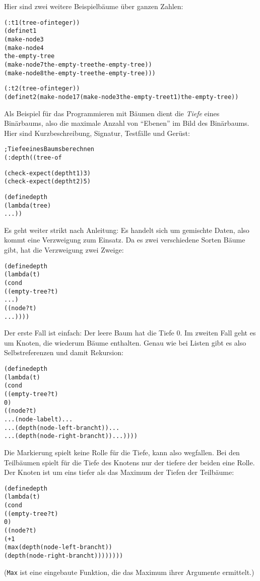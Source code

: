 %
Hier sind zwei weitere Beispielbäume über ganzen Zahlen:
\begin{alltt}
(: t1 (tree-of integer))
(define t1
  (make-node 3
    (make-node 4
      the-empty-tree
      (make-node 7 the-empty-tree the-empty-tree))
    (make-node 8 the-empty-tree the-empty-tree)))

(: t2 (tree-of integer))
(define t2 (make-node 17 (make-node 3 the-empty-tree t1) the-empty-tree))
\end{alltt}
Als Beispiel für das Programmieren mit Bäumen dient die
\textit{Tiefe}
eines Binärbaums, also die maximale Anzahl von "`Ebenen"' im Bild des
Binärbaums.  Hier sind Kurzbeschreibung, Signatur, Testfälle und
Gerüst:
%
\begin{alltt}
; Tiefe eines Baums berechnen
(: depth ((tree-of %a) -> natural))

(check-expect (depth t1) 3)
(check-expect (depth t2) 5)

(define depth
  (lambda (tree)
    ...))
\end{alltt}
%
Es geht weiter strikt nach Anleitung: Es handelt sich um gemischte
Daten, also kommt eine Verzweigung zum Einsatz.  Da es zwei
verschiedene Sorten Bäume gibt, hat die Verzweigung zwei Zweige:
%
\begin{alltt}
(define depth
  (lambda (t)
    (cond
      ((empty-tree? t)
       ...)
      ((node? t)
       ...))))
\end{alltt}
%
Der erste Fall ist einfach: Der leere Baum hat die Tiefe 0.  Im
zweiten Fall geht es um Knoten, die wiederum Bäume enthalten.  Genau
wie bei Listen gibt es also Selbstreferenzen und damit Rekursion:
%
\begin{alltt}
(define depth
  (lambda (t)
    (cond
      ((empty-tree? t)
       0)
      ((node? t)
       ... (node-label t) ...
       ... (depth (node-left-branch t)) ...
       ... (depth (node-right-branch t)) ...))))
\end{alltt}
%
Die Markierung spielt keine Rolle für die Tiefe, kann also wegfallen.
Bei den Teilbäumen spielt für die Tiefe des Knotens nur der tiefere
der beiden eine Rolle.  Der Knoten ist um eins tiefer als das Maximum
der Tiefen der Teilbäume:
%
\begin{alltt}
(define depth
  (lambda (t)
    (cond
      ((empty-tree? t)
       0)
      ((node? t)
       (+ 1
          (max (depth (node-left-branch t))
               (depth (node-right-branch t))))))))
\end{alltt}
%
(\texttt{Max} ist eine eingebaute Funktion,
die das Maximum ihrer Argumente ermittelt.)

